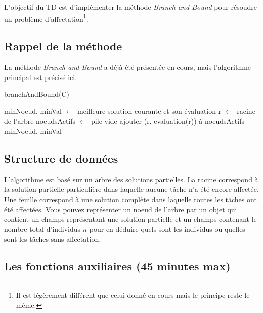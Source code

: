 \documentclass[a4paper,francais]{article}
\theoremstyle{definition}
\begin{document}
L'objectif du TD est d'implémenter la méthode \emph{Branch and Bound}
pour résoudre un problème d'affectation\footnote{Il est légèrement différent
que celui donné en cours mais le principe reste le même.}. 

\subsection{Rappel de la méthode}

La méthode \emph{Branch and Bound} a déjà été présentée en cours,
mais l'algorithme principal est précisé ici. 

  \begin{algorithm}[H]
    \caption{branchAndBound(C)}
    \label{alg:bb}
    minNoeud, minVal $\leftarrow$ meilleure solution courante et son évaluation \;
    r $\leftarrow$ racine de l'arbre \;
    noeudsActifs $\leftarrow$ pile vide \;
    ajouter (r, evaluation(r)) à noeudsActifs \; 
    \Return minNoeud, minVal
  \end{algorithm}

\subsection{Structure de données}

L'algorithme est basé sur un arbre des solutions partielles. La racine
correspond à la solution partielle particulière dans laquelle aucune tâche
n'a été encore affectée. Une feuille correspond à une solution complète
dans laquelle toutes les tâches ont été affectées. 
Vous pouvez représenter un noeud de l'arbre par un objet qui contient
un champs représentant une solution partielle et un champs contenant
le nombre total d'individus $n$ pour en déduire quels sont les individus
ou quelles sont les tâches sans affectation.  

\subsection{Les fonctions auxiliaires (45 minutes max)}
\end{document}
